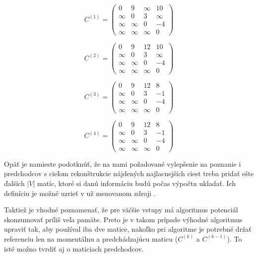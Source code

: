 \begin{equation}
  \label{C1}
  C^{(1)} =
  \begin{pmatrix}
    0 & 9 & \infty & 10 \\
    \infty & 0 & 3 & \infty \\
    \infty & \infty & 0 & -4 \\
    \infty & \infty & \infty & 0
  \end{pmatrix}
\end{equation}

\begin{equation}
  \label{C2}
  C^{(2)} =
  \begin{pmatrix}
    0 & 9 & 12 & 10 \\
    \infty & 0 & 3 & \infty \\
    \infty & \infty & 0 & -4 \\
    \infty & \infty & \infty & 0
  \end{pmatrix}
\end{equation}

\begin{equation}
  \label{C3}
  C^{(3)} =
  \begin{pmatrix}
    0 & 9 & 12 & 8 \\
    \infty & 0 & 3 & -1 \\
    \infty & \infty & 0 & -4 \\
    \infty & \infty & \infty & 0
  \end{pmatrix}
\end{equation}

\begin{equation}
  \label{C4}
  C^{(4)} =
  \begin{pmatrix}
    0 & 9 & 12 & 8 \\
    \infty & 0 & 3 & -1 \\
    \infty & \infty & 0 & -4 \\
    \infty & \infty & \infty & 0
  \end{pmatrix}
\end{equation}

Opäť je namieste podotknúť, že na nami požadované vylepšenie na poznanie i predchodcov s cieľom rekonštrukcie nájdených najlacnejších ciest treba pridať ešte ďalších $|V|$ matíc, ktoré si danú informáciu budú počas výpočtu ukladať. Ich definíciu je možné uzrieť v už menovanom zdroji \cite[kapitola 2.2.2]{duris2009}.\newline

Taktiež je vhodné poznamenať, že pre väčšie vstupy má algoritmus potenciál skonzumovať príliš veľa pamäte. Preto je v takom prípade výhodné algoritmus upraviť tak, aby používal iba dve matice, nakoľko pri algoritme je potrebné držať referenciu len na momentálnu a predchádzajúcu maticu ($C^{(k)}$ a $C^{(k-1)}$). To isté možno tvrdiť aj o maticiach predchodcov.\newline

